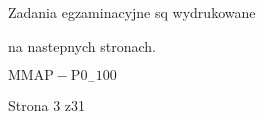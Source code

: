 \documentclass[a4paper,12pt]{article}
\begin{document}
Zadania egzaminacyjne sq wydrukowane

na nastepnych stronach.

$\mathrm{M}\mathrm{M}\mathrm{A}\mathrm{P}-\mathrm{P}0_{-}100$

Strona 3 z31
\end{document}
